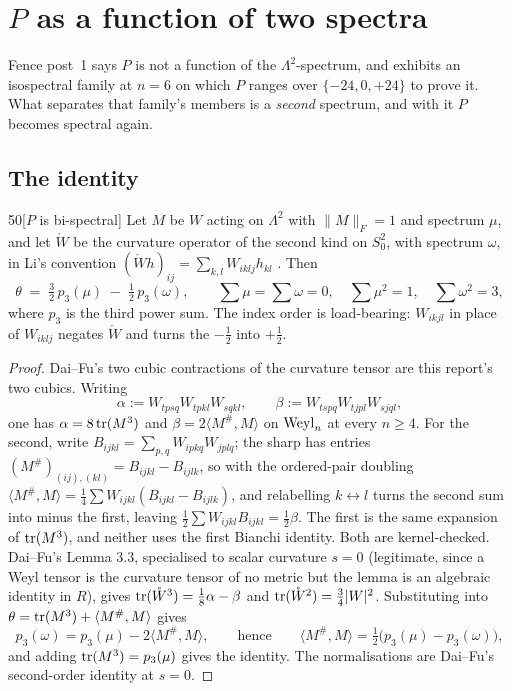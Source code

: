 \section{$P$ as a function of two spectra}\label{sec:bispectral}

Fence post~1 says $P$ is not a function of the $\Lambda^2$-spectrum, and exhibits an isospectral family at $n=6$ on which $P$ ranges over $\{-24,0,+24\}$ to prove it. What separates that family's members is a \emph{second} spectrum, and with it $P$ becomes spectral again.

\subsection{The identity}\label{sec:bispectralid}

\begin{Lem}{50}[$P$ is bi-spectral]
Let $M$ be $W$ acting on $\Lambda^2$ with $\|M\|_F=1$ and spectrum $\mu$, and let $\mathring W$ be the curvature operator of the second kind on $S^2_0$, with spectrum $\omega$, in Li's convention $(\mathring Wh)_{ij}=\sum_{k,l}W_{iklj}h_{kl}$ \cite[eq.\ (2.2)]{li2021}. Then
\[
\theta\;=\;\tfrac32\,p_3(\mu)\;-\;\tfrac12\,p_3(\omega),
\qquad
\textstyle\sum\mu=\sum\omega=0,\quad \sum\mu^2=1,\quad\sum\omega^2=3 ,
\]
where $p_3$ is the third power sum. The index order is load-bearing: $W_{ikjl}$ in place of $W_{iklj}$ negates $\mathring W$ and turns the $-\tfrac12$ into $+\tfrac12$.
\end{Lem}

\begin{proof}
Dai--Fu's two cubic contractions of the curvature tensor \cite{daifu2023} are this report's two cubics. Writing
\[
\alpha:=W_{tpsq}W_{tpkl}W_{sqkl},\qquad \beta:=W_{tspq}W_{tjpl}W_{sjql},
\]
one has $\alpha=8\operatorname{tr}(M^3)$ and $\beta=2\langle M^{\#},M\rangle$ on $\mathrm{Weyl}_n$ at every $n\ge4$. For the second, write $B_{ijkl}=\sum_{p,q}W_{ipkq}W_{jplq}$; the sharp has entries $(M^{\#})_{(ij),(kl)}=B_{ijkl}-B_{ijlk}$, so with the ordered-pair doubling $\langle M^{\#},M\rangle=\tfrac14\sum W_{ijkl}(B_{ijkl}-B_{ijlk})$, and relabelling $k\leftrightarrow l$ turns the second sum into minus the first, leaving $\tfrac12\sum W_{ijkl}B_{ijkl}=\tfrac12\beta$. The first is the same expansion of $\operatorname{tr}(M^3)$, and neither uses the first Bianchi identity. Both are kernel-checked. Dai--Fu's Lemma 3.3, specialised to scalar curvature $s=0$ (legitimate, since a Weyl tensor is the curvature tensor of no metric but the lemma is an algebraic identity in $R$), gives $\operatorname{tr}(\mathring W^3)=\tfrac18\alpha-\beta$ and $\operatorname{tr}(\mathring W^2)=\tfrac34|W|^2$. Substituting into $\theta=\operatorname{tr}(M^3)+\langle M^{\#},M\rangle$ gives
\[
p_3(\omega)=p_3(\mu)-2\langle M^{\#},M\rangle,
\qquad\text{hence}\qquad
\langle M^{\#},M\rangle=\tfrac12\big(p_3(\mu)-p_3(\omega)\big),
\]
and adding $\operatorname{tr}(M^3)=p_3(\mu)$ gives the identity. The normalisations are Dai--Fu's second-order identity at $s=0$.
\end{proof}

